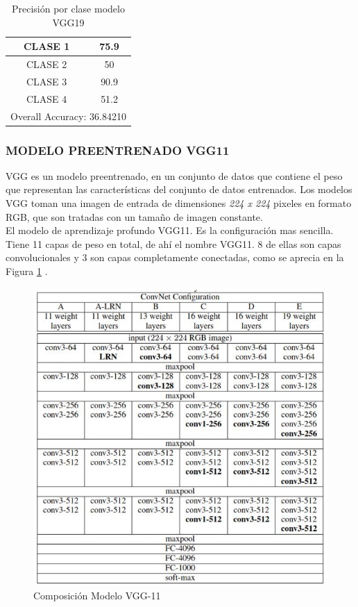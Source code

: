 			\begin{table}[htbp]
				\centering
				\begin{tabular}{|c|c|}
					\hline
					CLASE 1 & 75.9 \bigstrut\\
					\hline
					CLASE 2 & 50 \bigstrut\\
					\hline
					CLASE 3 & 90.9 \bigstrut\\
					\hline
					CLASE 4 & 51.2 \bigstrut\\
					\hline
					\multicolumn{2}{|c|}{Overall Accuracy: 36.84210} \bigstrut\\
					\hline
				\end{tabular}%
				\caption{Precisión por clase modelo VGG19}
				\label{fig:ACU_VGG19}
			\end{table}%
		
		
			\newpage
			\subsubsection{\MakeUppercase{Modelo preentrenado VGG11}}
			VGG es un modelo preentrenado, en un conjunto de datos que contiene el peso que representan las características del conjunto de datos entrenados. Los modelos VGG toman una imagen de entrada de dimensiones \textit{224 x 224} pixeles en formato RGB, que son tratadas con un tamaño de imagen constante.\\
			
			
			 El modelo de aprendizaje profundo VGG11. Es la configuración mas sencilla. Tiene 11 capas de peso en total, de ahí el nombre VGG11. 8 de ellas son capas convolucionales y 3 son capas completamente conectadas, como se aprecia en la Figura \ref{fig:VGG11} \cite{ref_3}.
			
			\begin{figure}[ht]
				\centering
				\includegraphics[scale=0.6]{Figs/70.png}
				\caption{Composición Modelo VGG-11}
				\label{fig:VGG11}
			\end{figure}
		
